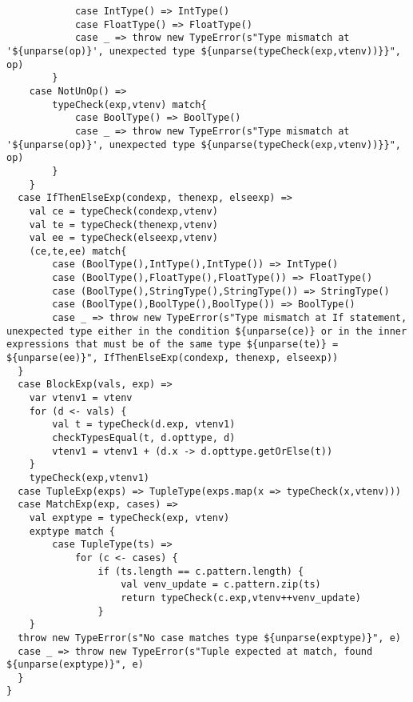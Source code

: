 \documentclass[a4paper, 10pt]{article}
\begin{document}
\begin{lstlisting}
			case IntType() => IntType()
  			case FloatType() => FloatType()
	  		case _ => throw new TypeError(s"Type mismatch at '${unparse(op)}', unexpected type ${unparse(typeCheck(exp,vtenv))}}", op)
  		}
  	case NotUnOp() =>
  		typeCheck(exp,vtenv) match{
  			case BoolType() => BoolType()
			case _ => throw new TypeError(s"Type mismatch at '${unparse(op)}', unexpected type ${unparse(typeCheck(exp,vtenv))}}", op)
  		}
  	}
  case IfThenElseExp(condexp, thenexp, elseexp) =>
  	val ce = typeCheck(condexp,vtenv)
  	val te = typeCheck(thenexp,vtenv)
  	val ee = typeCheck(elseexp,vtenv)
  	(ce,te,ee) match{
  		case (BoolType(),IntType(),IntType()) => IntType()
  		case (BoolType(),FloatType(),FloatType()) => FloatType()
  		case (BoolType(),StringType(),StringType()) => StringType()
  		case (BoolType(),BoolType(),BoolType()) => BoolType()
  		case _ => throw new TypeError(s"Type mismatch at If statement, unexpected type either in the condition ${unparse(ce)} or in the inner expressions that must be of the same type ${unparse(te)} = ${unparse(ee)}", IfThenElseExp(condexp, thenexp, elseexp))
  }
  case BlockExp(vals, exp) =>
  	var vtenv1 = vtenv
 	for (d <- vals) {
  		val t = typeCheck(d.exp, vtenv1)
  		checkTypesEqual(t, d.opttype, d)
  		vtenv1 = vtenv1 + (d.x -> d.opttype.getOrElse(t))
  	}
  	typeCheck(exp,vtenv1)
  case TupleExp(exps) => TupleType(exps.map(x => typeCheck(x,vtenv)))
  case MatchExp(exp, cases) =>
  	val exptype = typeCheck(exp, vtenv)
  	exptype match {
  		case TupleType(ts) =>
 			for (c <- cases) {
  				if (ts.length == c.pattern.length) {
  					val venv_update = c.pattern.zip(ts)
  					return typeCheck(c.exp,vtenv++venv_update)
  				}
  	}
  throw new TypeError(s"No case matches type ${unparse(exptype)}", e)
  case _ => throw new TypeError(s"Tuple expected at match, found ${unparse(exptype)}", e)
  }
}
\end{lstlisting}
\end{document}
